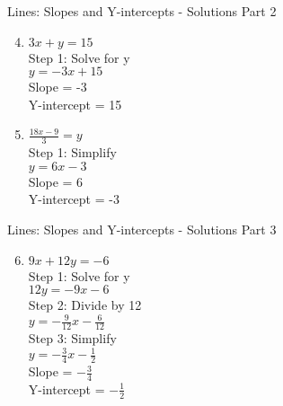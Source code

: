 \documentclass[aspectratio=169]{beamer}
\begin{document}
\begin{frame}{Lines: Slopes and Y-intercepts - Solutions Part 2}
    \begin{tcolorbox}[colback=lightgray,colframe=accent,title=Detailed Solutions]
        \begin{enumerate}
            \setcounter{enumi}{3}
            \item $3x + y = 15$ \\
                Step 1: Solve for y \\
                $y = -3x + 15$ \\
                Slope = -3 \\
                Y-intercept = 15
            
            \item $\frac{18x - 9}{3} = y$ \\
                Step 1: Simplify \\
                $y = 6x - 3$ \\
                Slope = 6 \\
                Y-intercept = -3
        \end{enumerate}
    \end{tcolorbox}
\end{frame}

\begin{frame}{Lines: Slopes and Y-intercepts - Solutions Part 3}
    \begin{tcolorbox}[colback=lightgray,colframe=accent,title=Detailed Solutions]
        \begin{enumerate}
            \setcounter{enumi}{5}
            \item $9x + 12y = -6$ \\
                Step 1: Solve for y \\
                $12y = -9x - 6$ \\
                Step 2: Divide by 12 \\
                $y = -\frac{9}{12}x - \frac{6}{12}$ \\
                Step 3: Simplify \\
                $y = -\frac{3}{4}x - \frac{1}{2}$ \\
                Slope = $-\frac{3}{4}$ \\
                Y-intercept = $-\frac{1}{2}$
        \end{enumerate}
    \end{tcolorbox}
\end{frame}
\end{document}
